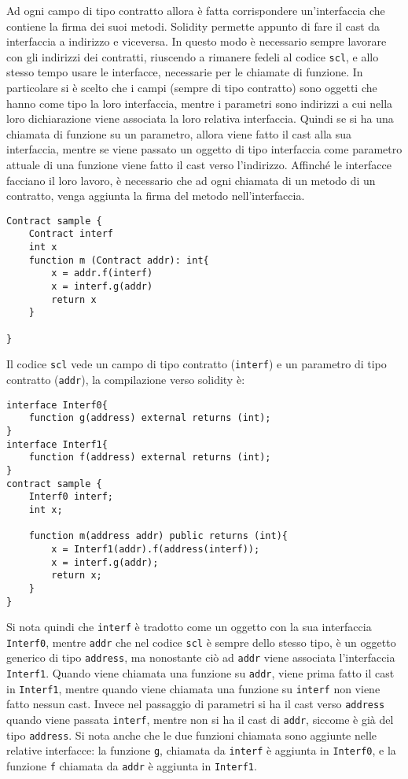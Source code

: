 \documentclass[]{article}
\begin{document}
Ad ogni campo di tipo contratto allora è fatta corrispondere
un'interfaccia che contiene la firma dei suoi metodi. Solidity permette
appunto di fare il cast da interfaccia a indirizzo e viceversa. In
questo modo è necessario sempre lavorare con gli indirizzi dei
contratti, riuscendo a rimanere fedeli al codice \texttt{scl}, e allo
stesso tempo usare le interfacce, necessarie per le chiamate di
funzione. In particolare si è scelto che i campi (sempre di tipo
contratto) sono oggetti che hanno come tipo la loro interfaccia, mentre
i parametri sono indirizzi a cui nella loro dichiarazione viene
associata la loro relativa interfaccia. Quindi se si ha una chiamata di
funzione su un parametro, allora viene fatto il cast alla sua
interfaccia, mentre se viene passato un oggetto di tipo interfaccia come
parametro attuale di una funzione viene fatto il cast verso l'indirizzo.
Affinché le interfacce facciano il loro lavoro, è necessario che ad ogni
chiamata di un metodo di un contratto, venga aggiunta la firma del
metodo nell'interfaccia.

\begin{verbatim}
Contract sample {
    Contract interf
    int x
    function m (Contract addr): int{
        x = addr.f(interf)
        x = interf.g(addr)
        return x
    }

}
\end{verbatim}

Il codice \texttt{scl} vede un campo di tipo contratto (\texttt{interf})
e un parametro di tipo contratto (\texttt{addr}), la compilazione verso
solidity è:

\begin{verbatim}
interface Interf0{
    function g(address) external returns (int);
}
interface Interf1{
    function f(address) external returns (int);
}
contract sample {
    Interf0 interf;
    int x;

    function m(address addr) public returns (int){
        x = Interf1(addr).f(address(interf));
        x = interf.g(addr);
        return x;
    }
}
\end{verbatim}

Si nota quindi che \texttt{interf} è tradotto come un oggetto con la sua
interfaccia \texttt{Interf0}, mentre \texttt{addr} che nel codice
\texttt{scl} è sempre dello stesso tipo, è un oggetto generico di tipo
\texttt{address}, ma nonostante ciò ad \texttt{addr} viene associata
l'interfaccia \texttt{Interf1}. Quando viene chiamata una funzione su
\texttt{addr}, viene prima fatto il cast in \texttt{Interf1}, mentre
quando viene chiamata una funzione su \texttt{interf} non viene fatto
nessun cast. Invece nel passaggio di parametri si ha il cast verso
\texttt{address} quando viene passata \texttt{interf}, mentre non si ha
il cast di \texttt{addr}, siccome è già del tipo \texttt{address}. Si
nota anche che le due funzioni chiamata sono aggiunte nelle relative
interfacce: la funzione \texttt{g}, chiamata da \texttt{interf} è
aggiunta in \texttt{Interf0}, e la funzione \texttt{f} chiamata da
\texttt{addr} è aggiunta in \texttt{Interf1}.
\end{document}
